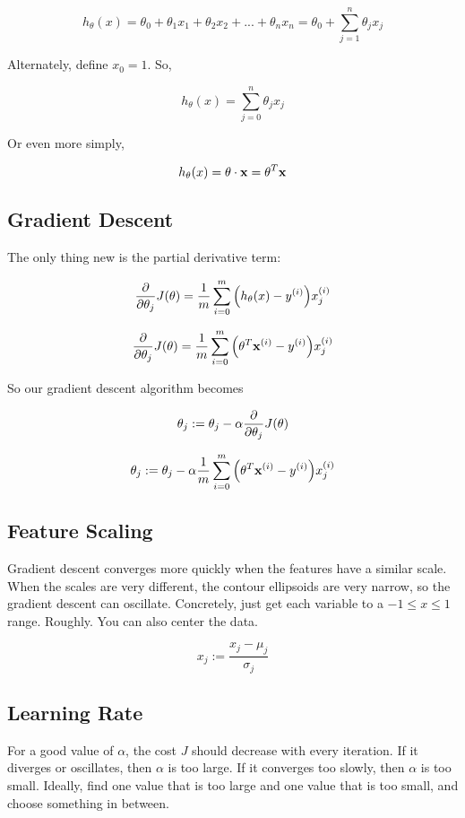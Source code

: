 \[ h_{\theta}(x) = \theta_0 + \theta_1 x_1 + \theta_2 x_2 + ... + \theta_n x_n = \theta_0 + \sum_{j=1}^n \theta_j x_j \]

Alternately, define $x_0 = 1$.  So,

\[ h_{\theta}(x) = \sum_{j=0}^n \theta_j x_j \]

Or even more simply,

\[ h_{\theta}(x) = \vb{\theta} \cdot \vb{x} = \vb{\theta}^T \vb{x} \]

\subsection{Gradient Descent}

The only thing new is the partial derivative term:

\[ \pdv{\theta_j} J(\vb{\theta})  = \frac{1}{m} \sum_{i=0}^m \qty( h_{\theta}(x) - y_{}^{(i)} ) x_{j}^{(i)} \]

\[ \pdv{\theta_j} J(\vb{\theta})  = \frac{1}{m} \sum_{i=0}^m \qty( \vb{\theta}^T \vb{x}^{(i)} - y_{}^{(i)} ) x_{j}^{(i)} \]

So our gradient descent algorithm becomes

\[ \theta_j := \theta_j - \alpha \pdv{\theta_j} J(\vb{\theta})  \]

\[ \theta_j := \theta_j - \alpha \frac{1}{m} \sum_{i=0}^m \qty( \vb{\theta}^T \vb{x}^{(i)} - y_{}^{(i)} ) x_{j}^{(i)} \]

\subsection{Feature Scaling}

Gradient descent converges more quickly when the features have a similar scale.
When the scales are very different, the contour ellipsoids are very narrow, so the gradient descent can oscillate.
Concretely, just get each variable to a $-1 \leq x \leq 1$ range.
Roughly.
You can also center the data.

\[ x_j := \frac{x_j - \mu_j}{\sigma_j} \]

\subsection{Learning Rate}

For a good value of $\alpha$, the cost $J$ should decrease with every iteration.
If it diverges or oscillates, then $\alpha$ is too large.
If it converges too slowly, then $\alpha$ is too small.
Ideally, find one value that is too large and one value that is too small, and choose something in between.

